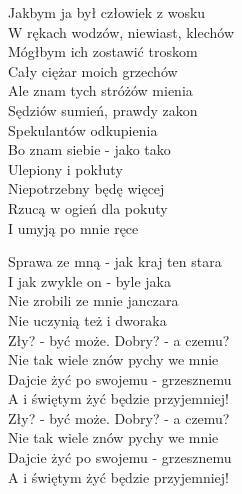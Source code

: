 \begin{text}
    Jakbym ja był człowiek z wosku\\
    W rękach wodzów, niewiast, klechów\\
    Mógłbym ich zostawić troskom\\
    Cały ciężar moich grzechów\\
    Ale znam tych stróżów mienia\\
    Sędziów sumień, prawdy zakon\\
    Spekulantów odkupienia\\
    Bo znam siebie - jako tako\\
    Ulepiony i pokłuty\\
    Niepotrzebny będę więcej\\
    Rzucą w ogień dla pokuty\\
    I umyją po mnie ręce

    \vin Sprawa ze mną - jak kraj ten stara\\
    \vin I jak zwykle on - byle jaka\\
    \vin Nie zrobili ze mnie janczara\\
    \vin Nie uczynią też i dworaka\\
    \vin Zły? - być może. Dobry? - a czemu?\\
    \vin Nie tak wiele znów pychy we mnie\\
    \vin Dajcie żyć po swojemu - grzesznemu\\
    \vin A i świętym żyć będzie przyjemniej!\\
    \vin Zły? - być może. Dobry? - a czemu?\\
    \vin Nie tak wiele znów pychy we mnie\\
    \vin Dajcie żyć po swojemu - grzesznemu\\
    \vin A i świętym żyć będzie przyjemniej!
\end{text}
